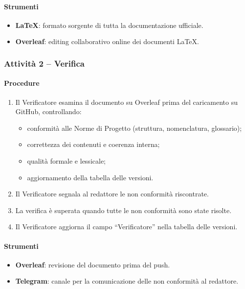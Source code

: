 \documentclass[a4paper, 11pt, oneside]{scrartcl}
\begin{document}
\paragraph{Strumenti}
\begin{itemize}
    \item \textbf{\LaTeX{}}: formato sorgente di tutta la documentazione ufficiale.
    \item \textbf{Overleaf}: editing collaborativo online dei documenti \LaTeX{}.
\end{itemize}

\subsubsection{Attività 2 – Verifica}

\paragraph{Procedure}
\begin{enumerate}
    \item Il Verificatore esamina il documento su Overleaf prima del caricamento su GitHub, controllando:
          \begin{itemize}
              \item conformità alle Norme di Progetto (struttura, nomenclatura, glossario);
              \item correttezza dei contenuti e coerenza interna;
              \item qualità formale e lessicale;
              \item aggiornamento della tabella delle versioni.
          \end{itemize}
    \item Il Verificatore segnala al redattore le non conformità riscontrate.
    \item La verifica è superata quando tutte le non conformità sono state risolte.
    \item Il Verificatore aggiorna il campo ``Verificatore'' nella tabella delle versioni.
\end{enumerate}

\paragraph{Strumenti}
\begin{itemize}
    \item \textbf{Overleaf}: revisione del documento prima del push.
    \item \textbf{Telegram}: canale per la comunicazione delle non conformità al redattore.
\end{itemize}
\end{document}
